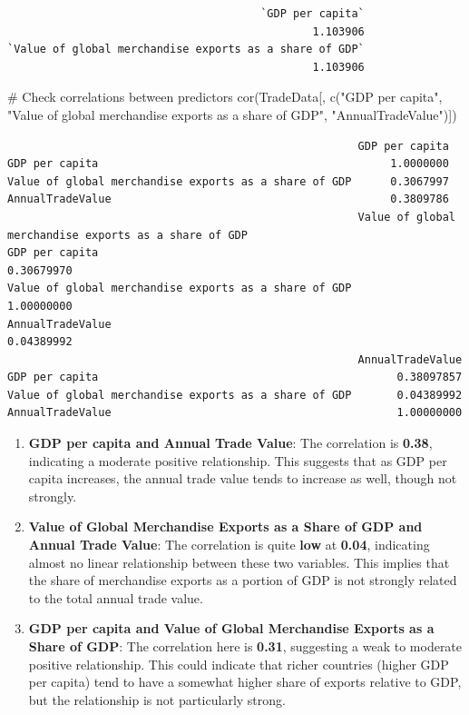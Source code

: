 \documentclass[
  10pt,
]{article}
\newenvironment{Shaded}{\begin{snugshade}}{\end{snugshade}}
\newcommand{\CommentTok}[1]{\textcolor[rgb]{0.37,0.37,0.37}{#1}}
\newcommand{\FunctionTok}[1]{\textcolor[rgb]{0.28,0.35,0.67}{#1}}
\newcommand{\NormalTok}[1]{\textcolor[rgb]{0.00,0.23,0.31}{#1}}
\newcommand{\StringTok}[1]{\textcolor[rgb]{0.13,0.47,0.30}{#1}}
\begin{document}
\begin{verbatim}
                                       `GDP per capita` 
                                               1.103906 
`Value of global merchandise exports as a share of GDP` 
                                               1.103906 
\end{verbatim}

\begin{Shaded}
\begin{Highlighting}[]
\CommentTok{\# Check correlations between predictors}
\FunctionTok{cor}\NormalTok{(TradeData[, }\FunctionTok{c}\NormalTok{(}\StringTok{"GDP per capita"}\NormalTok{, }\StringTok{"Value of global merchandise exports as a share of GDP"}\NormalTok{, }\StringTok{"AnnualTradeValue"}\NormalTok{)])}
\end{Highlighting}
\end{Shaded}

\begin{verbatim}
                                                      GDP per capita
GDP per capita                                             1.0000000
Value of global merchandise exports as a share of GDP      0.3067997
AnnualTradeValue                                           0.3809786
                                                      Value of global merchandise exports as a share of GDP
GDP per capita                                                                                   0.30679970
Value of global merchandise exports as a share of GDP                                            1.00000000
AnnualTradeValue                                                                                 0.04389992
                                                      AnnualTradeValue
GDP per capita                                              0.38097857
Value of global merchandise exports as a share of GDP       0.04389992
AnnualTradeValue                                            1.00000000
\end{verbatim}

\begin{enumerate}
\def\labelenumi{\arabic{enumi}.}
\item
  \textbf{GDP per capita and Annual Trade Value}: The correlation is
  \textbf{0.38}, indicating a moderate positive relationship. This
  suggests that as GDP per capita increases, the annual trade value
  tends to increase as well, though not strongly.
\item
  \textbf{Value of Global Merchandise Exports as a Share of GDP and
  Annual Trade Value}: The correlation is quite \textbf{low} at
  \textbf{0.04}, indicating almost no linear relationship between these
  two variables. This implies that the share of merchandise exports as a
  portion of GDP is not strongly related to the total annual trade
  value.
\item
  \textbf{GDP per capita and Value of Global Merchandise Exports as a
  Share of GDP}: The correlation here is \textbf{0.31}, suggesting a
  weak to moderate positive relationship. This could indicate that
  richer countries (higher GDP per capita) tend to have a somewhat
  higher share of exports relative to GDP, but the relationship is not
  particularly strong.
\end{enumerate}
\end{document}
